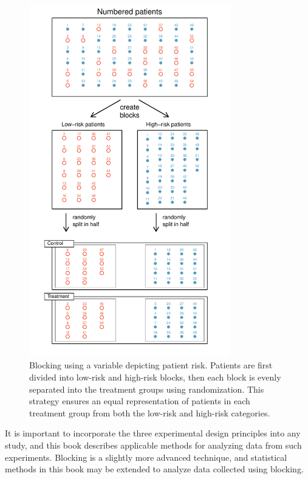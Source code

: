 \begin{doublespace}
	\begin{figure}
		\centering
		\includegraphics[width=0.78\textwidth]{ch_intro_to_data_oi_biostat/figures/figureShowingBlocking/figureShowingBlocking}
		\caption{Blocking using a variable depicting patient risk. Patients are first divided into low-risk and high-risk blocks, then each block is evenly separated into the treatment groups using randomization. This strategy ensures an equal representation of patients in each treatment group from both the low-risk and high-risk categories.}
		\label{figureShowingBlocking}
	\end{figure}
	

It is important to incorporate the three experimental design principles into any study, and this book describes applicable methods for analyzing data from such experiments. Blocking is a slightly more advanced technique, and statistical methods in this book may be extended to analyze data collected using blocking.




\end{doublespace}

